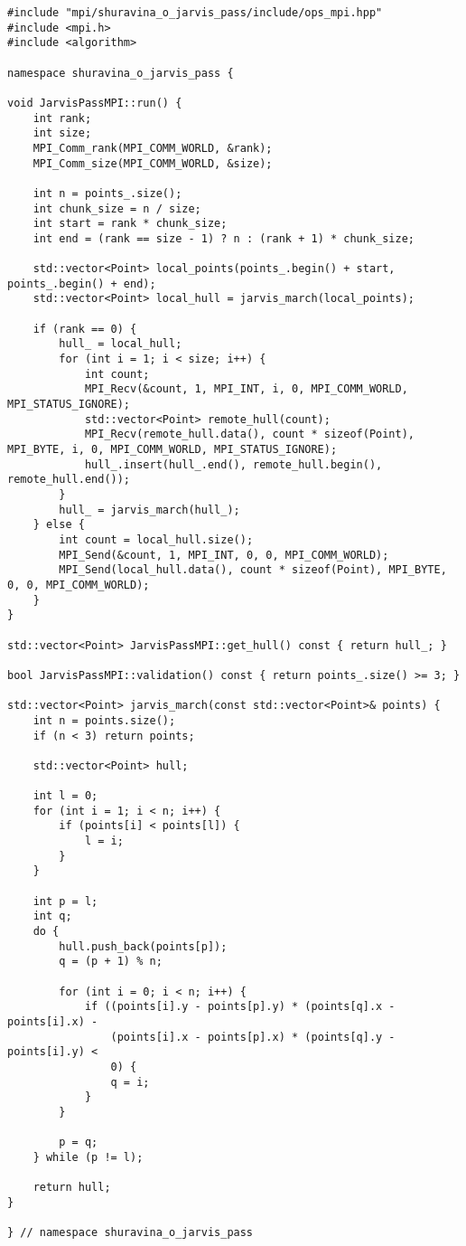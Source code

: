 \documentclass[12pt]{article}
\begin{document}
\newpage

\begin{lstlisting}[caption={ops\_mpi\_.cpp}]
#include "mpi/shuravina_o_jarvis_pass/include/ops_mpi.hpp"
#include <mpi.h>
#include <algorithm>

namespace shuravina_o_jarvis_pass {

void JarvisPassMPI::run() {
    int rank;
    int size;
    MPI_Comm_rank(MPI_COMM_WORLD, &rank);
    MPI_Comm_size(MPI_COMM_WORLD, &size);

    int n = points_.size();
    int chunk_size = n / size;
    int start = rank * chunk_size;
    int end = (rank == size - 1) ? n : (rank + 1) * chunk_size;

    std::vector<Point> local_points(points_.begin() + start, points_.begin() + end);
    std::vector<Point> local_hull = jarvis_march(local_points);

    if (rank == 0) {
        hull_ = local_hull;
        for (int i = 1; i < size; i++) {
            int count;
            MPI_Recv(&count, 1, MPI_INT, i, 0, MPI_COMM_WORLD, MPI_STATUS_IGNORE);
            std::vector<Point> remote_hull(count);
            MPI_Recv(remote_hull.data(), count * sizeof(Point), MPI_BYTE, i, 0, MPI_COMM_WORLD, MPI_STATUS_IGNORE);
            hull_.insert(hull_.end(), remote_hull.begin(), remote_hull.end());
        }
        hull_ = jarvis_march(hull_);
    } else {
        int count = local_hull.size();
        MPI_Send(&count, 1, MPI_INT, 0, 0, MPI_COMM_WORLD);
        MPI_Send(local_hull.data(), count * sizeof(Point), MPI_BYTE, 0, 0, MPI_COMM_WORLD);
    }
}

std::vector<Point> JarvisPassMPI::get_hull() const { return hull_; }

bool JarvisPassMPI::validation() const { return points_.size() >= 3; }

std::vector<Point> jarvis_march(const std::vector<Point>& points) {
    int n = points.size();
    if (n < 3) return points;

    std::vector<Point> hull;

    int l = 0;
    for (int i = 1; i < n; i++) {
        if (points[i] < points[l]) {
            l = i;
        }
    }

    int p = l;
    int q;
    do {
        hull.push_back(points[p]);
        q = (p + 1) % n;

        for (int i = 0; i < n; i++) {
            if ((points[i].y - points[p].y) * (points[q].x - points[i].x) -
                (points[i].x - points[p].x) * (points[q].y - points[i].y) <
                0) {
                q = i;
            }
        }

        p = q;
    } while (p != l);

    return hull;
}

} // namespace shuravina_o_jarvis_pass
\end{lstlisting}
\end{document}
